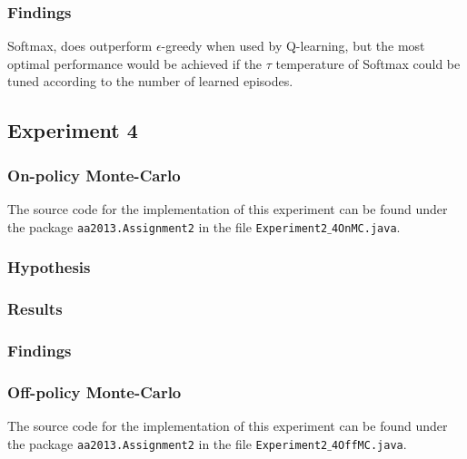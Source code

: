 \documentclass[11pt]{article}
\begin{document}
\subsubsection{Findings}
Softmax, does outperform $\epsilon$-greedy when used by Q-learning, but the most optimal performance would be achieved if the $\tau$ temperature of Softmax could be tuned according to the number of learned episodes.




\subsection{Experiment 4}



\subsubsection{On-policy Monte-Carlo}
The source code for the implementation of this experiment can be found under the package \texttt{aa2013.Assignment2} in the file \texttt{Experiment2$\_$4OnMC.java}.



\subsubsection{Hypothesis}




\subsubsection{Results}



\subsubsection{Findings}





\subsubsection{Off-policy Monte-Carlo}
The source code for the implementation of this experiment can be found under the package \texttt{aa2013.Assignment2} in the file \texttt{Experiment2$\_$4OffMC.java}.
\end{document}
